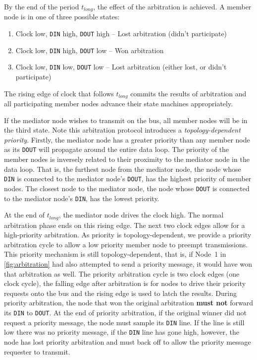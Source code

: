 By the end of the period $t_{long}$, the effect of the arbitration is
achieved. A member node is in one of three possible states:
\begin{enumerate}
  \item Clock low, {\tt DIN} high, {\tt DOUT} high -- Lost arbitration
    (didn't participate)
  \item Clock low, {\tt DIN} high, {\tt DOUT} low -- Won arbitration
  \item Clock low, {\tt DIN} low, {\tt DOUT} low -- Lost arbitration
    (either lost, or didn't participate)
\end{enumerate}
The rising edge of clock that follows $t_{long}$ commits the results of
arbitration and all participating member nodes advance their state machines
appropriately.

If the mediator node wishes to transmit on the bus, all member nodes will be in
the third state. Note this arbitration protocol introduces a {\em
topology-dependent priority}. Firstly, the mediator node has a greater priority
than any member node as its {\tt DOUT} will propagate around the entire data
loop. The priority of the member nodes is inversely related to their proximity
to the mediator node in the data loop. That is, the furthest node from the
mediator node, the node whose {\tt DIN} is connected to the mediator node's
{\tt DOUT}, has the highest priority of member nodes. The closest node to the
mediator node, the node whose {\tt DOUT} is connected to the mediator node's
{\tt DIN}, has the lowest priority.

At the end of $t_{long}$, the mediator node drives the clock high. The
normal arbitration phase ends on this rising edge. The next two clock edges
allow for a high-priority arbitration. As \bus priority is topology-dependent,
we provide a priority arbitration cycle to allow a low priority member node to
preempt transmissions. This priority mechanism is still topology-dependent,
that is, if Node~1 in \cref{fig:arbitration} had also attempted to send
a priority message, it would have won that arbitration as well. The priority
arbitration cycle is two clock edges (one clock cycle), the falling edge after
arbitration is for nodes to drive their priority requests onto the bus and the
rising edge is used to latch the results.  During priority arbitration, the
node that won the original arbitration {\bf must not} forward its {\tt DIN} to
{\tt DOUT}. At the end of priority
arbitration, if the original winner did not request a priority message, the
node must sample its {\tt DIN} line. If the line is still low there was no
priority message, if the {\tt DIN} line has gone high, however, the node
has lost priority arbitration and must back off to allow the priority message
requester to transmit.

